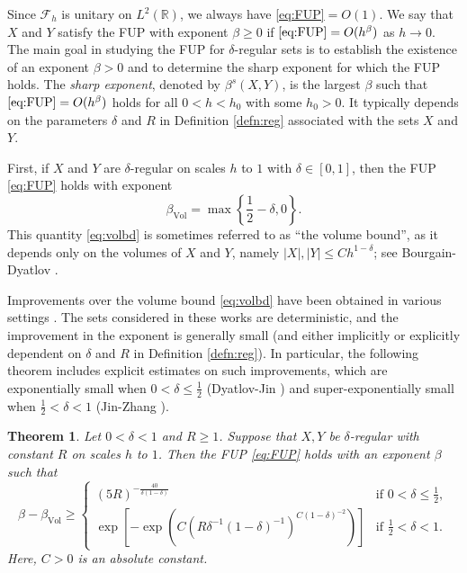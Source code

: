 \documentclass[12pt,reqno]{amsart}
\newcommand\Fc{\mathcal{F}}
\newcommand\R{\mathbb{R}}
\newcommand\Vol{\mathrm{Vol}}
\theoremstyle{plain}
\newtheorem{thm}{\textbf{Theorem}}[section]
\theoremstyle{remark}
\numberwithin{equation}{section}
\begin{document}
Since $\Fc_h$ is unitary on $L^2(\R)$, we always have \eqref{eq:FUP}$=O(1)$. We say that $X$ and $Y$ satisfy the FUP with exponent $\beta\ge0$ if $\eqref{eq:FUP}=O(h^\beta)$ as $h\to0$. The main goal in studying the FUP for $\delta$-regular sets is to establish the existence of an exponent $\beta>0$ and to determine the sharp exponent for which the FUP holds. The \textit{sharp exponent}, denoted by $\beta^s(X,Y)$, is the largest $\beta$ such that $\eqref{eq:FUP}=O(h^\beta)$ holds for all $0<h<h_0$ with some $h_0>0$. It typically depends on the parameters $\delta$ and $R$ in Definition \ref{defn:reg} associated with the sets $X$ and $Y$.

First, if $X$ and $Y$ are $\delta$-regular on scales $h$ to $1$ with $\delta\in[0,1]$, then the FUP \eqref{eq:FUP} holds with exponent
\begin{equation}\label{eq:volbd}
\beta_\Vol=\max\left\{\frac12-\delta,0\right\}.
\end{equation}
This quantity \eqref{eq:volbd} is sometimes referred to as ``the volume bound'', as it depends only on the volumes of $X$ and $Y$, namely $|X|,|Y|\le Ch^{1-\delta}$; see Bourgain-Dyatlov \cite[Lemma 2.9]{BD2}.

Improvements over the volume bound \eqref{eq:volbd} have been obtained in various settings \cite{BD1, BD2, BLT, C1, C2, CT, DJ1, DJ2, HS, JZ}. The sets considered in these works are deterministic, and the improvement in the exponent is generally small (and either implicitly or explicitly dependent on $\delta$ and $R$ in Definition \ref{defn:reg}). In particular, the following theorem includes explicit estimates on such improvements, which are exponentially small when $0<\delta\le\frac12$ (Dyatlov-Jin \cite[Theorem 1]{DJ2}) and super-exponentially small when $\frac12<\delta<1$ (Jin-Zhang \cite[Theorem 1.2]{JZ}).

\begin{thm}\label{thm:FUPdeter}
Let $0<\delta<1$ and $R\ge1$. Suppose that $X,Y$ be $\delta$-regular with constant $R$ on scales $h$ to $1$. Then the FUP \eqref{eq:FUP} holds with an exponent $\beta$ such that
$$\beta-\beta_\Vol\ge\begin{cases}
(5R)^{-\frac{40}{\delta(1-\delta)}} & \text{if }0<\delta\le\frac12,\\
\exp\left[-\exp\left(C\left(R\delta^{-1}(1-\delta)^{-1}\right)^{C(1-\delta)^{-2}}\right)\right] & \text{if }\frac12<\delta<1.
\end{cases}$$
Here, $C>0$ is an absolute constant.
\end{thm}
\end{document}
